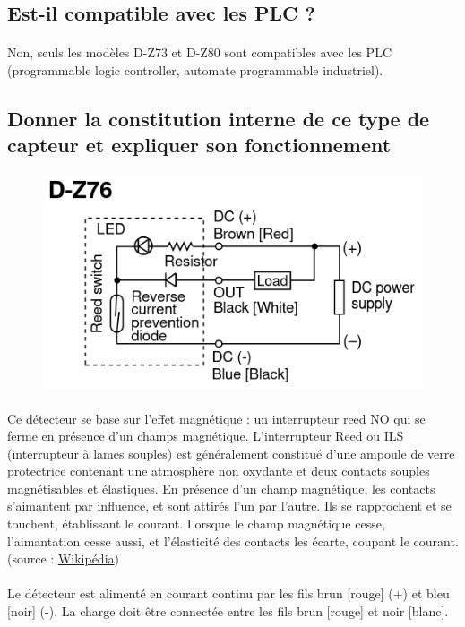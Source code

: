 \documentclass{article}
\begin{document}
\subsection{Est-il compatible avec les PLC ?}
\paragraph{}
Non, seuls les modèles D-Z73 et D-Z80 sont compatibles avec les PLC (programmable logic controller, automate programmable industriel).

\subsection{Donner la constitution interne de ce type de capteur et expliquer son fonctionnement}

\begin{figure}[H]
    \centering
    \includegraphics[width=.5\linewidth]{images/D-Z76-schema.png}
\end{figure}

\paragraph{}
Ce détecteur se base sur l'effet magnétique : un interrupteur reed NO qui se ferme en présence d'un champs magnétique. L'interrupteur Reed ou ILS (interrupteur à lames souples) est généralement constitué d'une ampoule de verre protectrice contenant une atmosphère non oxydante et deux contacts souples magnétisables et élastiques. En présence d'un champ magnétique, les contacts s'aimantent par influence, et sont attirés l'un par l'autre. Ils se rapprochent et se touchent, établissant le courant. Lorsque le champ magnétique cesse, l'aimantation cesse aussi, et l'élasticité des contacts les écarte, coupant le courant. (source : \href{https://fr.wikipedia.org/wiki/Interrupteur_reed}{Wikipédia})


\paragraph{}
Le détecteur est alimenté en courant continu par les fils brun [rouge] (+) et bleu [noir] (-). La charge doit être connectée entre les fils brun [rouge] et noir [blanc].
\end{document}
